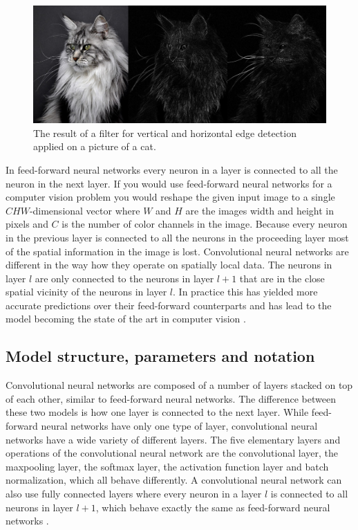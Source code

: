 \documentclass[a4paper, twoside]{article}
\begin{document}
\begin{figure}[h]
	\centering
  		\includegraphics[scale=0.33]{katter.png}
  	\caption{The result of a filter for vertical and horizontal edge detection applied on a picture of a cat.} \label{figkatter}
\end{figure}

In feed-forward neural networks every neuron in a layer is connected to all the neuron in the next layer. If you would use feed-forward neural networks for a computer vision problem you would reshape the given input image to a single $CHW$-dimensional vector where $W$ and $H$ are the images width and height in pixels and $C$ is the number of color channels in the image. Because every neuron in the previous layer is connected to all the neurons in the proceeding layer most of the spatial information in the image is lost. Convolutional neural networks are different in the way how they operate on spatially local data. The neurons in layer $l$ are only connected to the neurons in layer $l+1$ that are in the close spatial vicinity of the neurons in layer $l$. In practice this has yielded more accurate predictions over their feed-forward counterparts and has lead to the model becoming the state of the art in computer vision \cite{cs231n} \cite{convmath} \cite{convarithmetic}.

\subsection{Model structure, parameters and notation}
Convolutional neural networks are composed of a number of layers stacked on top of each other, similar to feed-forward neural networks. The difference between these two models is how one layer is connected to the next layer. While feed-forward neural networks have only one type of layer, convolutional neural networks have a wide variety of different layers. The five elementary layers and operations of the convolutional neural network are the convolutional layer, the maxpooling layer, the softmax layer, the activation function layer and batch normalization, which all behave differently. A convolutional neural network can also use fully connected layers where every neuron in a layer $l$ is connected to all neurons in layer $l+1$, which behave exactly the same as feed-forward neural networks \cite{cs231n} \cite{convmath} \cite{convarithmetic}.
\end{document}
